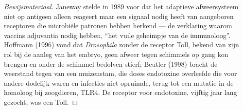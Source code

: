 \begin{proof}[Bewijsmateriaal]
Janeway stelde in 1989 voor dat het adaptieve afweersysteem niet op
antigeen alleen reageert maar een signaal nodig heeft van aangeboren
receptoren die microbiële patronen hebben herkend --- de verklaring
waarom vaccins adjuvantia nodig hebben, ``het vuile geheimpje van de
immunoloog''. Hoffmann (1996) vond dat \emph{Drosophila} zonder de
receptor Toll, bekend van zijn rol bij de aanleg van het embryo, geen
afweer tegen schimmels op gang kon brengen en onder de schimmel
bedolven stierf; Beutler (1998) bracht de weerstand tegen
 van een muizenstam, die doses endotoxine overleefde
die voor andere dodelijk waren en  infecties niet
opruimde, terug tot een mutatie in de homoloog bij zoogdieren, TLR4. De
receptor voor endotoxine, vijftig jaar lang gezocht, was een Toll.
\end{proof}

